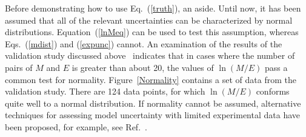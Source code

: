 \documentclass[fleqn,b5paper]{article}
\begin{document}
Before demonstrating how to use Eq.~(\ref{truth}), an aside. Until now, it has been assumed that all of the relevant uncertainties can be characterized by normal distributions. Equation~(\ref{lnMeq}) can be used to test this assumption, whereas Eqs.~(\ref{mdist}) and (\ref{expunc}) cannot. An examination of the results of the validation study discussed above~\cite{NUREG_1824} indicates that in cases where the number of pairs of $M$ and $E$ is greater than about 20, the values of $\ln (M/E)$ pass a common test for normality. Figure~\ref{Normality} contains a set of data from the validation study. There are 124 data points, for which $\ln (M/E)$ conforms quite well to a normal distribution. If normality cannot be assumed, alternative techniques for assessing model uncertainty with limited experimental data have been proposed, for example, see Ref.~\cite{Siu:1992}.
\end{document}
